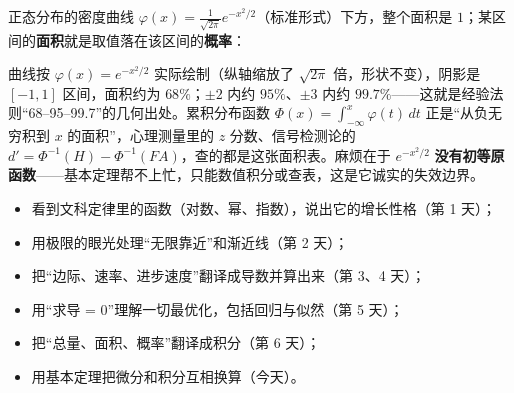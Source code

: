 \documentclass[UTF8,a4paper,11pt]{ctexart}
\begin{document}
正态分布的密度曲线 $\varphi(x)=\tfrac{1}{\sqrt{2\pi}}e^{-x^2/2}$（标准形式）下方，整个面积是 $1$；某区间的\textbf{面积}就是取值落在该区间的\textbf{概率}：

\begin{center}
\end{center}

曲线按 $\varphi(x)=e^{-x^2/2}$ 实际绘制（纵轴缩放了 $\sqrt{2\pi}$ 倍，形状不变），阴影是 $[-1,1]$ 区间，面积约为 $68\%$；$\pm2$ 内约 $95\%$、$\pm3$ 内约 $99.7\%$——这就是经验法则“68–95–99.7”的几何出处。累积分布函数 $\Phi(x)=\int_{-\infty}^{x}\varphi(t)\,dt$ 正是“从负无穷积到 $x$ 的面积”，心理测量里的 $z$ 分数、信号检测论的 $d'=\Phi^{-1}(H)-\Phi^{-1}(FA)$，查的都是这张面积表。麻烦在于 $e^{-x^2/2}$ \textbf{没有初等原函数}——基本定理帮不上忙，只能数值积分或查表，这是它诚实的失效边界。

\begin{keyconcept}
\begin{itemize}
  \item 看到文科定律里的函数（对数、幂、指数），说出它的增长性格（第 1 天）；
  \item 用极限的眼光处理“无限靠近”和渐近线（第 2 天）；
  \item 把“边际、速率、进步速度”翻译成导数并算出来（第 3、4 天）；
  \item 用“求导 = 0”理解一切最优化，包括回归与似然（第 5 天）；
  \item 把“总量、面积、概率”翻译成积分（第 6 天）；
  \item 用基本定理把微分和积分互相换算（今天）。
\end{itemize}
\end{keyconcept}
\end{document}
